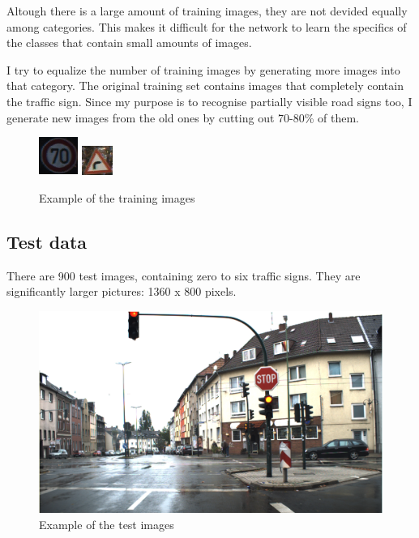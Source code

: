 Altough there is a large amount of training images, they are not devided equally among categories. This                       makes it difficult for the network to learn the specifics of the classes that contain small amounts of images.

I try to equalize the number of training images by generating more images into that category. The original training set contains images that completely contain the traffic sign. Since my purpose is to recognise partially visible road signs too, I generate new images from the old ones by cutting out 70-80\% of them.

\begin{figure}
\centering

\includegraphics{trainingImage}
\includegraphics{trainingImage2}
\caption{Example of the training images}

\label{fig:trainingImage}
\end{figure}

\subsection{Test data}

There are 900 test images, containing zero to six traffic signs. They are significantly larger pictures: 1360 x 800 pixels.

\begin{figure}
\centering

\includegraphics[scale=0.4]{testImage}
\caption{Example of the test images}

\label{fig:trainingImage}
\end{figure}

